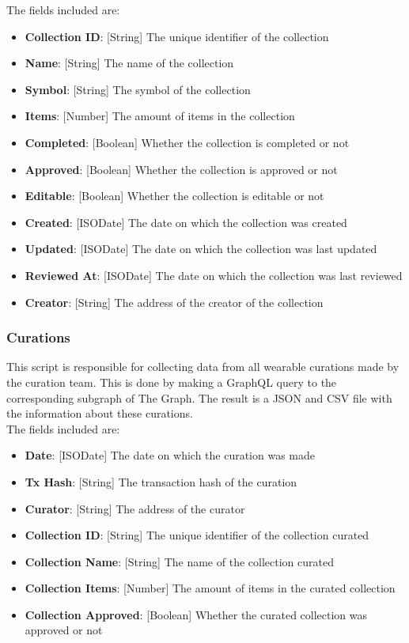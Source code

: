 \documentclass[MSE,Master,english]{twbook}%
\begin{document}
The fields included are:
\begin{itemize}
  \item \textbf{Collection ID}: [String] The unique identifier of the collection
  \item \textbf{Name}: [String] The name of the collection
  \item \textbf{Symbol}: [String] The symbol of the collection
  \item \textbf{Items}: [Number] The amount of items in the collection
  \item \textbf{Completed}: [Boolean] Whether the collection is completed or not
  \item \textbf{Approved}: [Boolean] Whether the collection is approved or not
  \item \textbf{Editable}: [Boolean] Whether the collection is editable or not
  \item \textbf{Created}: [ISODate] The date on which the collection was created
  \item \textbf{Updated}: [ISODate] The date on which the collection was last updated
  \item \textbf{Reviewed At}: [ISODate] The date on which the collection was last reviewed
  \item \textbf{Creator}: [String] The address of the creator of the collection
\end{itemize}

\subsubsection{Curations}
This script is responsible for collecting data from all wearable curations made by the curation team. This is done by making a GraphQL query to the corresponding subgraph of The Graph. The result is a JSON and CSV file with the information about these curations. \\

The fields included are:
\begin{itemize}
  \item \textbf{Date}: [ISODate] The date on which the curation was made
  \item \textbf{Tx Hash}: [String] The transaction hash of the curation
  \item \textbf{Curator}: [String] The address of the curator
  \item \textbf{Collection ID}: [String] The unique identifier of the collection curated
  \item \textbf{Collection Name}: [String] The name of the collection curated
  \item \textbf{Collection Items}: [Number] The amount of items in the curated collection
  \item \textbf{Collection Approved}: [Boolean] Whether the curated collection was approved or not
\end{itemize}
\end{document}
